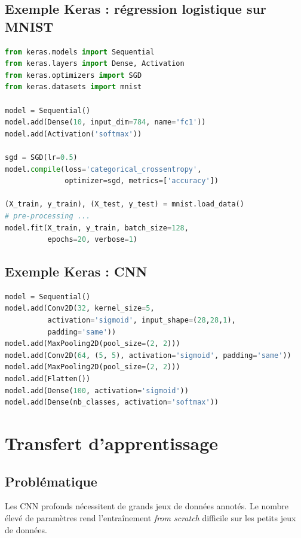 \documentclass[a4paper,11pt]{article}
\theoremstyle{definition}
\theoremstyle{remark}
\begin{document}
\subsection{Exemple Keras : r\'egression logistique sur MNIST}

\begin{lstlisting}[language=Python]
from keras.models import Sequential
from keras.layers import Dense, Activation
from keras.optimizers import SGD
from keras.datasets import mnist

model = Sequential()
model.add(Dense(10, input_dim=784, name='fc1'))
model.add(Activation('softmax'))

sgd = SGD(lr=0.5)
model.compile(loss='categorical_crossentropy',
              optimizer=sgd, metrics=['accuracy'])

(X_train, y_train), (X_test, y_test) = mnist.load_data()
# pre-processing ...
model.fit(X_train, y_train, batch_size=128,
          epochs=20, verbose=1)
\end{lstlisting}

\subsection{Exemple Keras : CNN}

\begin{lstlisting}[language=Python]
model = Sequential()
model.add(Conv2D(32, kernel_size=5,
          activation='sigmoid', input_shape=(28,28,1),
          padding='same'))
model.add(MaxPooling2D(pool_size=(2, 2)))
model.add(Conv2D(64, (5, 5), activation='sigmoid', padding='same'))
model.add(MaxPooling2D(pool_size=(2, 2)))
model.add(Flatten())
model.add(Dense(100, activation='sigmoid'))
model.add(Dense(nb_classes, activation='softmax'))
\end{lstlisting}

\section{Transfert d'apprentissage}

\subsection{Probl\'ematique}

Les CNN profonds n\'ecessitent de grands jeux de donn\'ees
annot\'es. Le nombre \'elev\'e de param\`etres rend l'entra\^inement
\emph{from scratch} difficile sur les petits jeux de donn\'ees.
\end{document}
